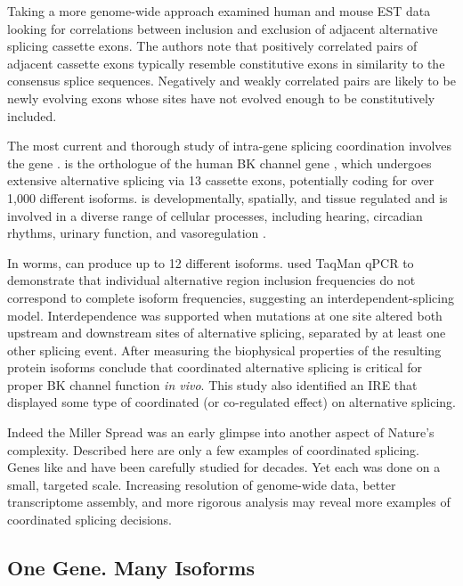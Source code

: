    Taking a more genome-wide approach \citet{Peng2008} examined human and mouse EST data looking for correlations between inclusion and exclusion of adjacent alternative splicing cassette exons. The authors note that positively correlated pairs of adjacent cassette exons typically resemble constitutive exons in similarity to the consensus splice sequences. Negatively and weakly correlated pairs are likely to be newly evolving exons whose sites have not evolved enough to be constitutively included.

    The most current and thorough study of intra-gene splicing coordination involves the \worms{} gene \slo{} \citep{Glauser2011, Johnson2011}. \slo{} is the \worms{} orthologue of the human BK channel gene \kcnma{}, which undergoes extensive alternative splicing \citep{Nilsen2010} via 13 cassette exons, potentially coding for over 1,000 different isoforms. \kcnma{} is developmentally, spatially, and tissue regulated and is involved in a diverse range of cellular processes, including hearing, circadian rhythms, urinary function, and vasoregulation \citep{Fodor2009a}.

    In worms, \slo{} can produce up to 12 different isoforms. \citet{Glauser2011} used TaqMan qPCR to demonstrate that individual alternative region inclusion frequencies do not correspond to complete isoform frequencies, suggesting an interdependent-splicing model. Interdependence was supported when mutations at one site altered both upstream and downstream sites of alternative splicing, separated by at least one other splicing event. After measuring the biophysical properties of the resulting protein isoforms \citep{Johnson2011} \citet{Glauser2011} conclude that coordinated alternative splicing is critical for proper BK channel function \textit{in vivo}. This study also identified an IRE that displayed some type of coordinated (or co-regulated effect) on alternative splicing.

    Indeed the Miller Spread was an early glimpse into another aspect of Nature's complexity. Described here are only a few examples of coordinated splicing. Genes like \fn{} and \slo{} have been carefully studied for decades. Yet each was done on a small, targeted scale. Increasing resolution of genome-wide data, better transcriptome assembly, and more rigorous analysis may reveal more examples of coordinated splicing decisions.

  \subsection{One Gene. Many Isoforms}
    \label{Intro:subsec:IsoformsPerGene}

